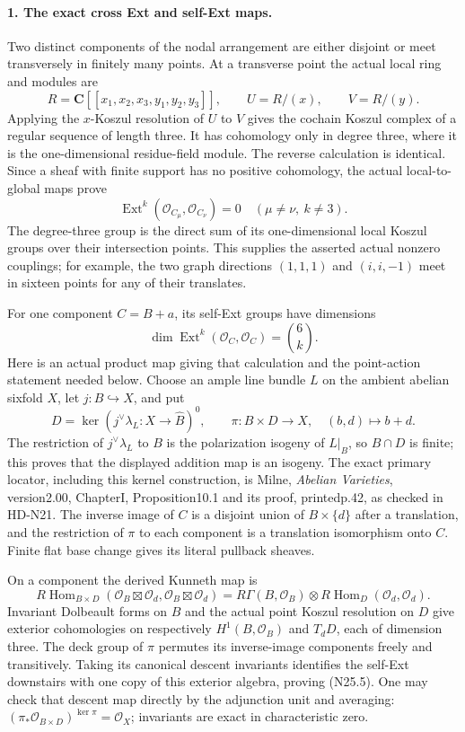 \paragraph{1. The exact cross Ext and self-Ext maps.}
Two distinct components of the nodal arrangement are either
disjoint or meet transversely in finitely many points. At a
transverse point the actual local ring and modules are
\[
 R=\mathbf C[[x_1,x_2,x_3,y_1,y_2,y_3]],\qquad
 U=R/(x),\qquad V=R/(y).
\]
Applying the $x$-Koszul resolution of $U$ to $V$ gives the
cochain Koszul complex of a regular sequence of length three.
It has cohomology only in degree three, where it is the
one-dimensional residue-field module. The reverse calculation
is identical. Since a sheaf with finite support has no positive
cohomology, the actual local-to-global maps prove
\[
 \operatorname{Ext}^k(\mathcal O_{C_\mu},\mathcal O_{C_\nu})=0
       \quad(\mu\ne\nu,\ k\ne3).                         \tag{N25.4}
\]
The degree-three group is the direct sum of its one-dimensional
local Koszul groups over their intersection points. This
supplies the asserted actual nonzero couplings; for example,
the two graph directions $(1,1,1)$ and $(i,i,-1)$ meet in
sixteen points for any of their translates.

For one component $C=B+a$, its self-Ext groups have dimensions
\[
             \dim\operatorname{Ext}^k(\mathcal O_C,\mathcal O_C)
                                   =\binom6k.              \tag{N25.5}
\]
Here is an actual product map giving that calculation and the
point-action statement needed below. Choose an ample line
bundle $L$ on the ambient abelian sixfold $X$, let
$j:B\hookrightarrow X$, and put
\[
 D=\ker(j^\vee\lambda_L:X\to\widehat B)^0,
 \qquad\pi:B\times D\to X,\quad(b,d)\mapsto b+d.           \tag{N25.6}
\]
The restriction of $j^\vee\lambda_L$ to $B$ is the
polarization isogeny of $L|_B$, so $B\cap D$ is finite;
this proves that the displayed addition map is an isogeny.
The exact primary locator, including this kernel construction,
is Milne, \emph{Abelian Varieties}, version2.00, ChapterI,
Proposition10.1 and its proof, printedp.42, as checked in HD-N21.
The inverse image of $C$ is a disjoint union of $B\times\{d\}$
after a translation, and the restriction of $\pi$ to each
component is a translation isomorphism onto $C$.
Finite flat base change gives its literal pullback sheaves.

On a component the derived Kunneth map is
\[
 R\operatorname{Hom}_{B\times D}
 (\mathcal O_B\boxtimes\mathcal O_d,
  \mathcal O_B\boxtimes\mathcal O_d)
 =R\Gamma(B,\mathcal O_B)\otimes
                         R\operatorname{Hom}_D(\mathcal O_d,\mathcal O_d).
                                                               \tag{N25.7}
\]
Invariant Dolbeault forms on $B$ and the actual point Koszul
resolution on $D$ give exterior cohomologies on respectively
$H^1(B,\mathcal O_B)$ and $T_dD$, each of dimension three.
The deck group of $\pi$ permutes its inverse-image components
freely and transitively. Taking its canonical descent
invariants identifies the self-Ext downstairs with one copy
of this exterior algebra, proving (N25.5). One may check
that descent map directly by the adjunction unit and averaging:
$(\pi_*\mathcal O_{B\times D})^{\ker\pi}=\mathcal O_X$;
invariants are exact in characteristic zero.

